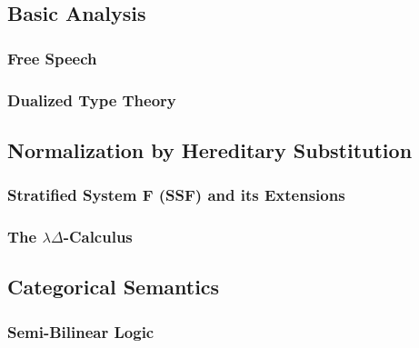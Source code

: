 \subsection{Basic Analysis}
\label{subsec:basic_analysis}
\subsubsection{Free Speech}
\label{subsubsec:free_speech}


\subsubsection{Dualized Type Theory}
\label{subsubsec:dtt}


\subsection{Normalization by Hereditary Substitution}
\label{subsec:normalization_by_hereditary_substitution}
\subsubsection{Stratified System F (SSF) and its Extensions}
\label{subsec:stratified_system_f_ext}


\subsubsection{The $\lambda\Delta$-Calculus}
\label{subsec:the_lambdadelta-calculus}



\subsection{Categorical Semantics}
\label{subsec:categorical_semantics}
\subsubsection{Semi-Bilinear Logic}
\label{subsec:semi-bilinear_logic}


